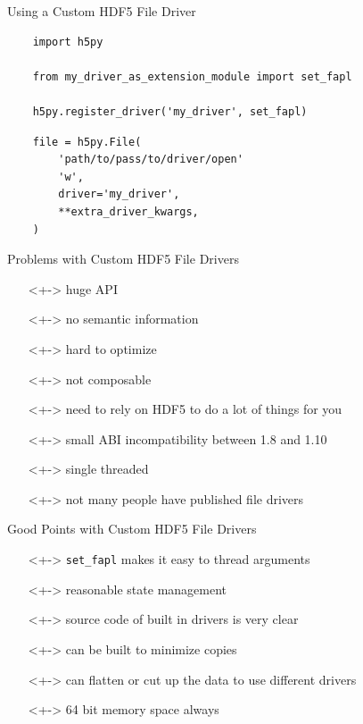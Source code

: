 \documentclass{beamer}
\begin{document}
\begin{frame}[fragile]{Using a Custom HDF5 File Driver}
  \begin{verbatim}
    import h5py

    from my_driver_as_extension_module import set_fapl

    h5py.register_driver('my_driver', set_fapl)
  \end{verbatim}
  \pause

  \begin{verbatim}
    file = h5py.File(
        'path/to/pass/to/driver/open'
        'w',
        driver='my_driver',
        **extra_driver_kwargs,
    )
  \end{verbatim}
\end{frame}

\begin{frame}{Problems with Custom HDF5 File Drivers}
  \begin{itemize}
  \item[]<+-> huge API
  \item[]<+-> no semantic information
  \item[]<+-> hard to optimize
  \item[]<+-> not composable
  \item[]<+-> need to rely on HDF5 to do a lot of things for you
  \item[]<+-> small ABI incompatibility between 1.8 and 1.10
  \item[]<+-> single threaded
  \item[]<+-> not many people have published file drivers
  \end{itemize}
\end{frame}

\begin{frame}{Good Points with Custom HDF5 File Drivers}
  \begin{itemize}
  \item[]<+-> \texttt{set\_fapl} makes it easy to thread arguments
  \item[]<+-> reasonable state management
  \item[]<+-> source code of built in drivers is very clear
  \item[]<+-> can be built to minimize copies
  \item[]<+-> can flatten or cut up the data to use different drivers
  \item[]<+-> 64 bit memory space always
  \end{itemize}
\end{frame}
\end{document}
